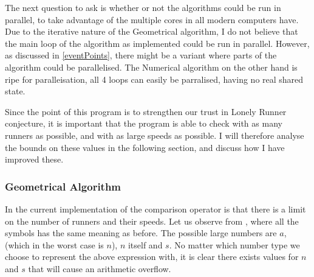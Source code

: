 The next question to ask is whether or not the algorithms could be run in parallel, to take advantage of the multiple cores in all modern computers have. Due to the iterative nature of the Geometrical algorithm, I do not believe that the main loop of the algorithm as implemented could be run in parallel. However, as discussed in \ref{eventPoints}, there might be a variant where parts of the algorithm could be parallelised. The Numerical algorithm on the other hand is ripe for paralleisation, all 4 loops can easily be parralised, having no real shared state.

Since the point of this program is to strengthen our trust in Lonely Runner conjecture, it is important that the program is able to check with as many runners as possible, and with as large speeds as possible. I will therefore analyse the bounds on these values in the following section, and discuss how I have improved these.

\subsubsection{Geometrical Algorithm}
In the current implementation of the comparison operator is that there is a limit on the number of runners and their speeds. Let us observe  
 from , where all the symbols has the same meaning as before. The possible large numbers are $a$, (which in the worst case is $n$), $n$ itself and $s$. No matter which number type we choose to represent the above expression with, it is clear there exists values for $n$ and $s$ that will cause an arithmetic overflow.


